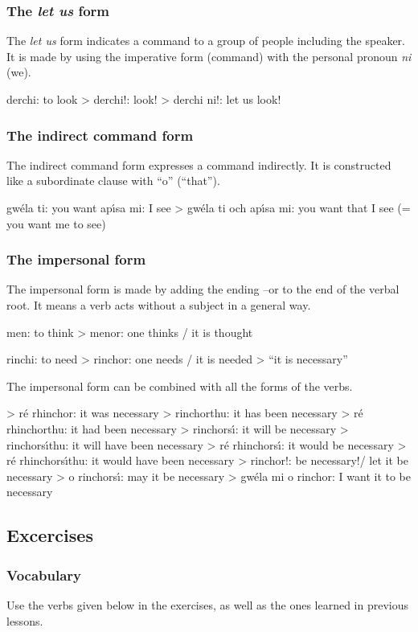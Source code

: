 \subsubsection{The \textit{let us} form}

The \textit{let us} form indicates a command to a group of people including the speaker. It is made by using the imperative form (command) with the personal pronoun \textit{ni} (we).

derchi: to look
> derchi!: look!
> derchi ni!: let us look!

\subsubsection{The indirect command form}

The indirect command form expresses a command indirectly. It is constructed like a subordinate clause with “o” (“that”).

gw\'{e}la ti: you want
ap\'{\i}sa mi: I see
> gw\'{e}la ti och ap\'{\i}sa mi: you want that I see (= you want me to see)

\subsubsection{The impersonal form}

The impersonal form is made by adding the ending –or to the end of the verbal root. It means a verb acts without a subject in a general way.

men: to think
> menor: one thinks / it is thought 

rinchi: to need
> rinchor: one needs / it is needed > “it is necessary”

The impersonal form can be combined with all the forms of the verbs.

> r\'{e} rhinchor: it was necessary
> rinchorthu: it has been necessary
> r\'{e} rhinchorthu: it had been necessary
> rinchors\'{\i}: it will be necessary
> rinchors\'{\i}thu: it will have been necessary
> r\'{e} rhinchors\'{\i}: it would be necessary
> r\'{e} rhinchors\'{\i}thu: it would have been necessary
> rinchor!: be necessary!/ let it be necessary
> o rinchors\'{\i}: may it be necessary
> gw\'{e}la mi o rinchor: I want it to be necessary


\subsection{Excercises}

\subsubsection{Vocabulary}
Use the verbs given below in the exercises, as well as the ones learned in previous lessons.

